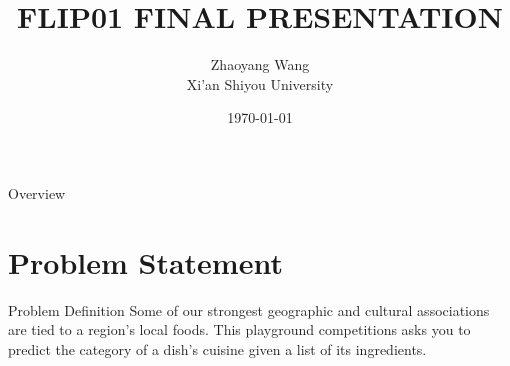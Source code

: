 \documentclass[
 size=12pt,
 paper=smartboard, %
 mode=present, %
 display=slides, %
style=tuliplab,
pauseslide,
fleqn,leqno]{powerdot}
\title{FLIP01 FINAL PRESENTATION}
\author{
Zhaoyang Wang
\\
Xi'an Shiyou University 
}
\date{\today}
\begin{document}
\maketitle 
\begin{slide}[toc=,bm=]{Overview}
  \tableofcontents[content=sections]
\end{slide}

  \section{Problem Statement}

  \begin{slide}{Problem Definition}
 \hspace{0.5cm}  Some of our strongest geographic and cultural associations are tied to a region's local foods. 
  This playground competitions asks you to predict the category of a dish's cuisine given a list of its
  ingredients. 
  \end{slide}
\end{document}
